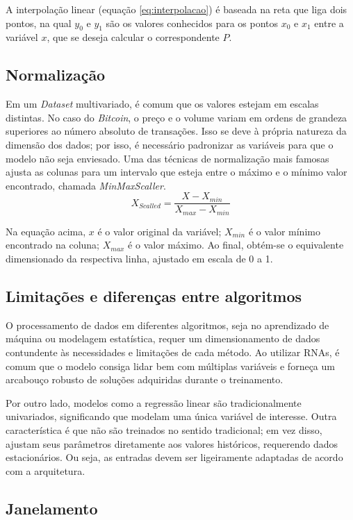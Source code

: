 A interpolação linear (equação \ref{eq:interpolacao}) é baseada na reta que liga dois pontos, na qual \(y_0\) e \(y_1\) são os valores conhecidos para os pontos
\(x_0\) e \(x_1\) entre a variável \(x\), que se deseja calcular o correspondente \(P\).

\subsection{Normalização} \label{sec:normalizar}
Em um \textit{Dataset} multivariado, é comum que os valores estejam em escalas distintas. No caso do \textit{Bitcoin}, o preço e o volume variam em ordens de grandeza superiores ao número absoluto de transações.
Isso se deve à própria natureza da dimensão dos dados; por isso, é necessário padronizar as variáveis para que o modelo não seja enviesado.
Uma das técnicas de normalização mais famosas ajusta as colunas para um intervalo que esteja entre o máximo e o mínimo valor encontrado,  chamada \textit{MinMaxScaller}.
\begin{equation}
    {X_{Scalled} = \frac{X-X_{min}}{X_{max}-X_{min}}}
    \label{eq:scalled}
\end{equation}

Na equação acima, $x$ é o valor original da variável; $X_{min}$ é o valor mínimo encontrado na coluna; $X_{max}$ é o valor máximo.
Ao final, obtém-se o equivalente dimensionado da respectiva linha, ajustado em escala de 0 a 1.

\subsection{Limitações e diferenças entre algoritmos} \label{sec:limitacao}
O processamento de dados em diferentes algoritmos, seja no aprendizado de máquina ou modelagem estatística, requer um dimensionamento de dados contundente às necessidades e limitações de cada método.
Ao utilizar RNAs, é comum que o modelo consiga lidar bem com múltiplas variáveis e forneça um arcabouço robusto de soluções adquiridas durante o treinamento.

Por outro lado, modelos como a regressão linear são tradicionalmente univariados, significando que modelam uma única variável de interesse.
Outra característica é que não são treinados no sentido tradicional; em vez disso, ajustam seus parâmetros diretamente aos valores históricos, requerendo dados estacionários.
Ou seja, as entradas devem ser ligeiramente adaptadas de acordo com a arquitetura.

\subsection{Janelamento} \label{sec:janelamento}

